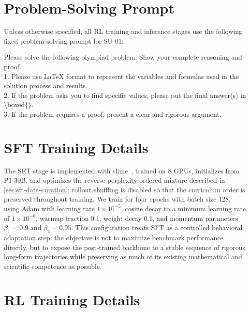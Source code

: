 \documentclass{llmxive}
\begin{document}
\section{Problem-Solving Prompt}
\label{app:problem-solving-prompt}

Unless otherwise specified, all RL training and inference stages use the following fixed problem-solving prompt for SU-01:

\begin{mdframed}[style=mdpurplebox,frametitle={Problem-Solving Prompt}]
\small
\ttfamily
Please solve the following olympiad problem. Show your complete reasoning and proof.\\[2pt]
1. Please use LaTeX format to represent the variables and formulas used in the solution process and results.\\
2. If the problem asks you to find specific values, please put the final answer(s) in \textbackslash boxed\{\}.\\
3. If the problem requires a proof, present a clear and rigorous argument.
\end{mdframed}




\section{SFT Training Details}
\label{app:sft-training-details}

The SFT stage is implemented with slime~\citep{thudm2026slime}, trained on 8 GPUs, initializes from P1-30B, and optimizes the reverse-perplexity-ordered mixture described in \cref{sec:sft-data-curation}; rollout shuffling is disabled so that the curriculum order is preserved throughout training. We train for four epochs with batch size 128, using Adam with learning rate $1\times 10^{-5}$, cosine decay to a minimum learning rate of $1\times 10^{-6}$, warmup fraction 0.1, weight decay 0.1, and momentum parameters $\beta_1=0.9$ and $\beta_2=0.95$. This configuration treats SFT as a controlled behavioral adaptation step: the objective is not to maximize benchmark performance directly, but to expose the post-trained backbone to a stable sequence of rigorous long-form trajectories while preserving as much of its existing mathematical and scientific competence as possible.

\section{RL Training Details}
\label{app:rl-training-details}
\end{document}
